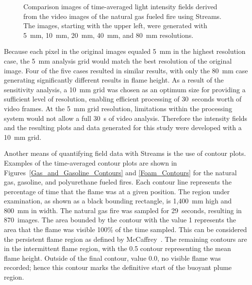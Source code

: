 \documentclass[twoside]{uocthesis}
\begin{document}
{\begin{figure}[p]
	 \caption[Comparison images of time-averaged light intensity fields derived from the video images of the natural gas fueled fire]{Comparison images of time-averaged light intensity fields derived from the video images of the natural gas fueled fire using Streams. The images, starting with the upper left, were generated with 5~mm, 10~mm, 20~mm, 40~mm, and 80~mm resolutions.}
	 \label{Intensity}
\end{figure}

Because each pixel in the original images equaled 5~mm in the highest resolution case, the 5~mm analysis grid would match the best resolution of the original image.  Four of the five cases resulted in similar results, with only the 80~mm case generating significantly different results in flame height.  As a result of the sensitivity analysis, a 10~mm grid was chosen as an optimum size for providing a sufficient level of resolution, enabling efficient processing of 30~seconds worth of video frames.  At the 5~mm grid resolution, limitations within the processing system would not allow a full 30~s of video analysis.  Therefore the intensity fields and the resulting plots and data generated for this study were developed with a 10~mm grid.

Another means of quantifying field data with Streams is the use of contour plots.  Examples of the time-averaged contour plots are shown in Figures~\ref{Gas_and_Gasoline_Contours} and \ref{Foam_Contours} for the natural gas, gasoline, and polyurethane fueled fires.  Each contour line represents the percentage of time that the flame was at a given position. The region under examination, as shown as a black bounding rectangle, is 1,400~mm high and 800~mm in width.  The natural gas fire was sampled for 29~seconds, resulting in 870~images. The area bounded by the contour with the value 1 represents the area that the flame was visible 100\% of the time sampled. This can be considered the persistent flame region as defined by McCaffrey~\cite{McCaffrey:1979}. The remaining contours are in the intermittent flame region, with the 0.5 contour representing the mean flame height. Outside of the final contour, value 0.0, no visible flame was recorded; hence this contour marks the definitive start of the buoyant plume region.

}
\end{document}
